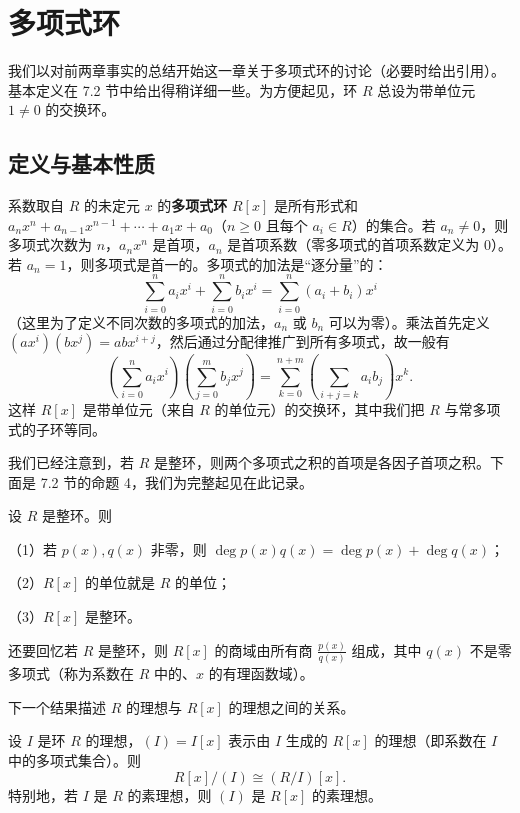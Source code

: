 

\setcounter{chapter}{8}

\chapter{多项式环}

我们以对前两章事实的总结开始这一章关于多项式环的讨论（必要时给出引用）。基本定义在 7.2 节中给出得稍详细一些。为方便起见，环 \(R\) 总设为带单位元 \(1 \neq 0\) 的交换环。

\section{定义与基本性质}

系数取自 \(R\) 的未定元 \(x\) 的\textbf{多项式环} \(R[x]\) 是所有形式和 \(a_nx^n + a_{n-1}x^{n-1} + \cdots + a_1x + a_0\)（\(n \geq 0\) 且每个 \(a_i \in R\)）的集合。若 \(a_n \neq 0\)，则多项式次数为 \(n\)，\(a_nx^n\) 是首项，\(a_n\) 是首项系数（零多项式的首项系数定义为 0）。若 \(a_n = 1\)，则多项式是首一的。多项式的加法是“逐分量”的：
\[
\sum_{i=0}^{n} a_ix^i + \sum_{i=0}^{n} b_ix^i = \sum_{i=0}^{n}(a_i+b_i)x^i
\]
（这里为了定义不同次数的多项式的加法，\(a_n\) 或 \(b_n\) 可以为零）。乘法首先定义 \((ax^i)(bx^j) = abx^{i+j}\)，然后通过分配律推广到所有多项式，故一般有
\[
\left(\sum_{i=0}^{n} a_ix^i\right)\left(\sum_{j=0}^{m} b_jx^j\right) = \sum_{k=0}^{n+m}\left(\sum_{i+j=k} a_ib_j\right)x^k.
\]
这样 \(R[x]\) 是带单位元（来自 \(R\) 的单位元）的交换环，其中我们把 \(R\) 与常多项式的子环等同。

我们已经注意到，若 \(R\) 是整环，则两个多项式之积的首项是各因子首项之积。下面是 7.2 节的命题 4，我们为完整起见在此记录。

\begin{proposition}\label{pro:9.1}
设 \(R\) 是整环。则

（1）若 \(p(x), q(x)\) 非零，则 \(\deg p(x)q(x) = \deg p(x) + \deg q(x)\)；

（2）\(R[x]\) 的单位就是 \(R\) 的单位；

（3）\(R[x]\) 是整环。
\end{proposition}

还要回忆若 \(R\) 是整环，则 \(R[x]\) 的商域由所有商 \(\frac{p(x)}{q(x)}\) 组成，其中 \(q(x)\) 不是零多项式（称为系数在 \(R\) 中的、\(x\) 的有理函数域）。

下一个结果描述 \(R\) 的理想与 \(R[x]\) 的理想之间的关系。

\begin{proposition}\label{pro:9.2}
设 \(I\) 是环 \(R\) 的理想，\((I) = I[x]\) 表示由 \(I\) 生成的 \(R[x]\) 的理想（即系数在 \(I\) 中的多项式集合）。则
\[
R[x]/(I) \cong (R/I)[x].
\]
特别地，若 \(I\) 是 \(R\) 的素理想，则 \((I)\) 是 \(R[x]\) 的素理想。
\end{proposition}

